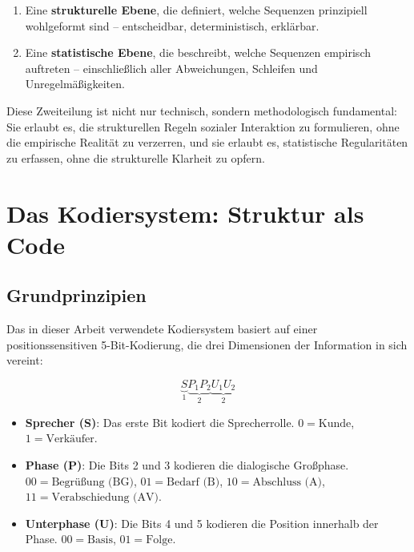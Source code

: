 \documentclass[
  12pt,
  a4paper,
  oneside,
  titlepage
]{article}
\begin{document}
\begin{enumerate}
    \item Eine \textbf{strukturelle Ebene}, die definiert, welche Sequenzen 
    prinzipiell wohlgeformt sind – entscheidbar, deterministisch, erklärbar.
    
    \item Eine \textbf{statistische Ebene}, die beschreibt, welche Sequenzen 
    empirisch auftreten – einschließlich aller Abweichungen, Schleifen und 
    Unregelmäßigkeiten.
\end{enumerate}

Diese Zweiteilung ist nicht nur technisch, sondern methodologisch 
fundamental: Sie erlaubt es, die strukturellen Regeln sozialer Interaktion 
zu formulieren, ohne die empirische Realität zu verzerren, und sie erlaubt 
es, statistische Regularitäten zu erfassen, ohne die strukturelle Klarheit 
zu opfern.

\section{Das Kodiersystem: Struktur als Code}

\subsection{Grundprinzipien}

Das in dieser Arbeit verwendete Kodiersystem basiert auf einer 
positionssensitiven 5-Bit-Kodierung, die drei Dimensionen der Information 
in sich vereint:

\[
\underbrace{S}_{1} \underbrace{P_1P_2}_{2} \underbrace{U_1U_2}_{2}
\]

\begin{itemize}
    \item \textbf{Sprecher (S)}: Das erste Bit kodiert die Sprecherrolle.
    \(0 = \text{Kunde}\), \(1 = \text{Verkäufer}\).
    
    \item \textbf{Phase (P)}: Die Bits 2 und 3 kodieren die dialogische 
    Großphase. \(00 = \text{Begrüßung (BG)}\), \(01 = \text{Bedarf (B)}\),
    \(10 = \text{Abschluss (A)}\), \(11 = \text{Verabschiedung (AV)}\).
    
    \item \textbf{Unterphase (U)}: Die Bits 4 und 5 kodieren die Position 
    innerhalb der Phase. \(00 = \text{Basis}\), \(01 = \text{Folge}\).
\end{itemize}
\end{document}
